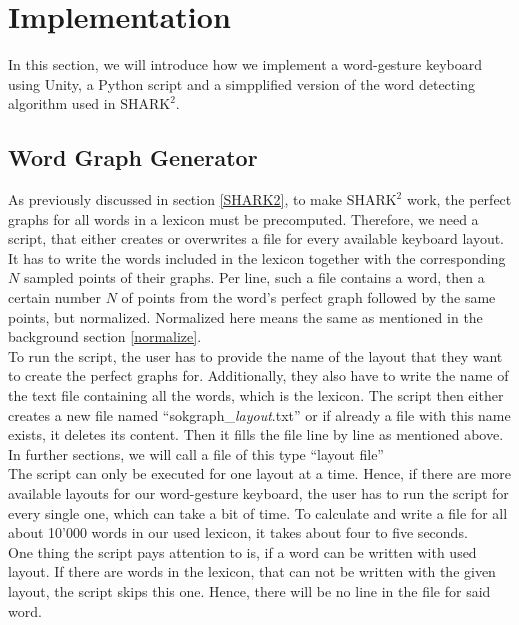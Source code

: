 \chapter{Implementation}

In this section, we will introduce how we implement a word-gesture keyboard using Unity, a Python script and a simpplified version of the word detecting algorithm used in $\text{SHARK}^2$.

\section{Word Graph Generator}
As previously discussed in section \ref{SHARK2}, to make $\text{SHARK}^2$ work, the perfect graphs for all words in a lexicon must be precomputed. Therefore, we need a script, that either creates or overwrites a file for every available keyboard layout. It has to write the words included in the lexicon together with the corresponding $N$ sampled points of their graphs. Per line, such a file contains a word, then a certain number $N$ of points from the word's perfect graph followed by the same points, but normalized. Normalized here means the same as mentioned in the background section \ref{normalize}.\\
To run the script, the user has to provide the name of the layout that they want to create the perfect graphs for. Additionally, they also have to write the name of the text file containing all the words, which is the lexicon. The script then either creates a new file named ``sokgraph\_\textit{layout}.txt'' or if already a file with this name exists, it deletes its content. Then it fills the file line by line as mentioned above. In further sections, we will call a file of this type ``layout file''\\
The script can only be executed for one layout at a time. Hence, if there are more available layouts for our word-gesture keyboard, the user has to run the script for every single one, which can take a bit of time. To calculate and write a file for all about 10'000 words in our used lexicon, it takes about four to five seconds.\\
One thing the script pays attention to is, if a word can be written with used layout. If there are words in the lexicon, that can not be written with the given layout, the script skips this one. Hence, there will be no line in the file for said word. 

